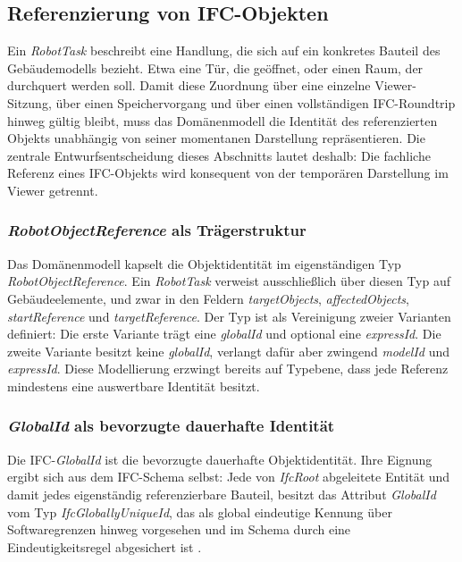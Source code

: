 \subsection{Referenzierung von IFC-Objekten}\label{subsec:Referenzierung_IFC-Objekten}
Ein \textit{RobotTask} beschreibt eine Handlung, die sich auf ein konkretes Bauteil des
Gebäudemodells bezieht. Etwa eine Tür, die geöffnet, oder einen Raum, der durchquert werden soll.
Damit diese Zuordnung über eine einzelne Viewer-Sitzung, über einen Speichervorgang und über einen
vollständigen IFC-Roundtrip hinweg gültig bleibt, muss das Domänenmodell die Identität des
referenzierten Objekts unabhängig von seiner momentanen Darstellung repräsentieren. Die zentrale
Entwurfsentscheidung dieses Abschnitts lautet deshalb: Die fachliche Referenz eines IFC-Objekts wird
konsequent von der temporären Darstellung im Viewer getrennt.

\subsubsection{\textit{RobotObjectReference} als Trägerstruktur}
Das Domänenmodell kapselt die Objektidentität im eigenständigen Typ \textit{RobotObjectReference}.
Ein \textit{RobotTask} verweist ausschließlich über diesen Typ auf Gebäudeelemente, und zwar in den
Feldern \textit{targetObjects}, \textit{affectedObjects}, \textit{startReference} und
\textit{targetReference}. Der Typ ist als Vereinigung zweier Varianten definiert: Die erste Variante
trägt eine \textit{globalId} und optional eine \textit{expressId}. Die zweite Variante besitzt keine
\textit{globalId}, verlangt dafür aber zwingend \textit{modelId} und \textit{expressId}. Diese
Modellierung erzwingt bereits auf Typebene, dass jede Referenz mindestens eine auswertbare Identität
besitzt.

\subsubsection{\textit{GlobalId} als bevorzugte dauerhafte Identität}
Die IFC-\textit{GlobalId} ist die bevorzugte dauerhafte Objektidentität. Ihre Eignung ergibt sich
aus dem IFC-Schema selbst: Jede von \textit{IfcRoot} abgeleitete Entität und damit jedes
eigenständig referenzierbare Bauteil, besitzt das Attribut \textit{GlobalId} vom Typ
\textit{IfcGloballyUniqueId}, das als global eindeutige Kennung über Softwaregrenzen hinweg
vorgesehen und im Schema durch eine Eindeutigkeitsregel abgesichert ist
\parencite{buildingsmart2024ifc43}.

